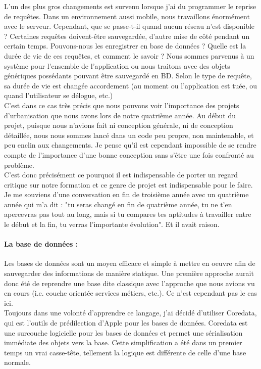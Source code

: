 \documentclass{article}
\begin{document}
		L'un des plus gros changements est survenu lorsque j'ai du programmer le reprise de requêtes. Dans un environnement aussi mobile, nous travaillons énormément avec le serveur. Cependant, que se passe-t-il quand aucun réseau n'est disponible ? Certaines requêtes doivent-être sauvegardée, d'autre mise de côté pendant un certain temps. Pouvons-nous les enregistrer en base de données ? Quelle est la durée de vie de ces requêtes, et comment le savoir ? Nous sommes parvenus à un système pour l'ensemble de l'application ou nous traitons avec des objets génériques possédants pouvant être sauvegardé en BD. Selon le type de requête, sa durée de vie est changée accordement (au moment ou l'application est tuée, ou quand l'utilisateur se délogue, etc.)  	\\
		
		C'est dans ce cas très précis que nous pouvons voir l'importance des projets d'urbanisation que nous avons lors de notre quatrième année. Au début du projet, puisque nous n'avions fait ni conception générale, ni de conception détaillée, nous nous sommes lancé dans un code peu propre, non maintenable, et peu enclin aux changements. Je pense qu'il est cependant impossible de se rendre compte de l'importance d'une bonne conception sans s'être une fois confronté au problème. \\
		
		C'est donc précisément ce pourquoi il est indispensable de porter un regard critique sur notre formation et ce genre de projet est indispensable pour le faire. Je me souviens d'une conversation en fin de troisième année avec un quatrième année qui m'a dit : "tu seras changé en fin de quatrième année, tu ne t'en apercevras pas tout au long, mais si tu compares tes aptitudes à travailler entre le début et la fin, tu verras l'importante évolution". Et il avait raison.\\
				
		\paragraph{La base de données :}
		Les bases de données sont un moyen efficace et simple à mettre en oeuvre afin de sauvegarder des informations de manière statique. Une première approche aurait donc été de reprendre une base dite classique avec l'approche que nous avions vu en cours (i.e. couche orientée services métiers, etc.). Ce n'est cependant pas le cas ici.\\
			
		Toujours dans une volonté d'apprendre ce langage, j'ai décidé d'utiliser Coredata, qui est l'outils de prédilection d'Apple pour les bases de données. Coredata est une surcouche logicielle pour les bases de données et permet une sérialisation immédiate des objets vers la base. Cette simplification a été dans un premier temps un vrai casse-tête, tellement la logique est différente de celle d'une base normale. \\
		
\end{document}
